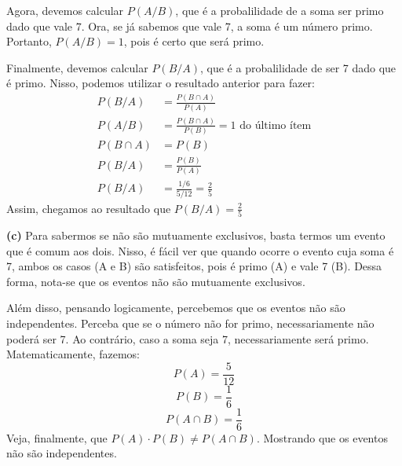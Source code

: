 \documentclass[12pt,a4paper]{article}
\begin{document}
Agora, devemos calcular $P(A/B)$, que é a probalilidade de a soma ser primo dado que vale 7. Ora, se já sabemos que vale 7, a soma é um número primo. Portanto, $P(A/B) = 1$, pois é certo que será primo.

Finalmente, devemos calcular $P(B/A)$, que é a probalilidade de ser 7 dado que é primo. Nisso, podemos utilizar o resultado anterior para fazer:
\begin{align*}
	P(B/A) &= \frac{P(B \cap A)}{P(A)}\\
	P(A/B) &= \frac{P(B \cap A)}{P(B)} = 1 \,\,\text{do último ítem}\\
	P(B \cap A) &= P(B)\\
	P(B/A) &= \frac{P(B)}{P(A)}\\
	P(B/A) &= \frac{1 / 6}{5 / 12} = \frac{2}{5}
\end{align*}
Assim, chegamos ao resultado que $P(B/A) = \frac{2}{5}$

\vspace{\baselineskip}

\noindent \textbf{(c)} Para sabermos se não são mutuamente exclusivos, basta termos um evento que é comum aos dois. Nisso, é fácil ver que quando ocorre o evento cuja soma é 7, ambos os casos (A e B) são satisfeitos, pois é primo (A) e vale 7 (B). Dessa forma, nota-se que os eventos não são mutuamente exclusivos.

Além disso, pensando logicamente, percebemos que os eventos não são independentes. Perceba que se o número não for primo, necessariamente não poderá ser 7. Ao contrário, caso a soma seja 7, necessariamente será primo. Matematicamente, fazemos:
\[P(A) = \frac{5}{12}\]
\[P(B) = \frac{1}{6}\]
\[P(A \cap B) = \frac{1}{6}\]
Veja, finalmente, que $P(A) \cdot P(B) \neq P(A \cap B)$. Mostrando que os eventos não são independentes.
\end{document}
